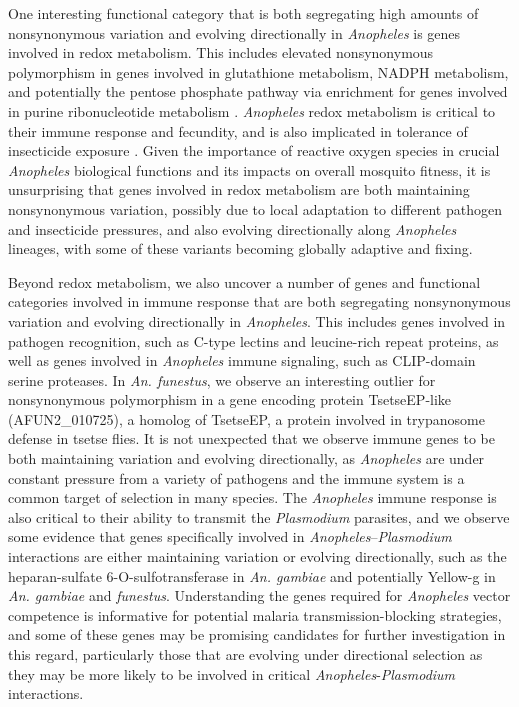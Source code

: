 One interesting functional category that is both 
segregating high amounts of nonsynonymous variation
and evolving directionally in \textit{Anopheles} is 
genes involved in redox metabolism. 
This includes elevated nonsynonymous polymorphism in 
genes involved in glutathione metabolism, NADPH metabolism, and 
potentially the pentose phosphate pathway via enrichment 
for genes involved in purine ribonucleotide metabolism 
\citep{Kanehisa_Furumichi_Sato_Matsuura_Ishiguro-Watanabe_2024}.
\textit{Anopheles} redox metabolism is critical to 
their immune response and fecundity, 
and is also implicated in tolerance of insecticide exposure 
\citep{redox_fecundity, redox_plasmodium, redox_gutmicro}.
Given the importance of reactive oxygen species in crucial
\textit{Anopheles} biological functions and its impacts on overall
mosquito fitness, it is unsurprising that genes involved in 
redox metabolism are both maintaining nonsynonymous variation, 
possibly due to local adaptation to different pathogen and 
insecticide pressures, and also evolving directionally along 
\textit{Anopheles} lineages, with some of these variants 
becoming globally adaptive and fixing.

Beyond redox metabolism, we also uncover a number of genes and 
functional categories involved in immune response that are 
both segregating nonsynonymous variation and evolving directionally in \textit{Anopheles}.
This includes genes involved in pathogen recognition, 
such as C-type lectins and leucine-rich repeat proteins, as 
well as genes involved in \textit{Anopheles} immune signaling, 
such as CLIP-domain serine proteases.
In \textit{An. funestus}, we observe an interesting outlier 
for nonsynonymous polymorphism in a gene encoding protein TsetseEP-like
(AFUN2\_010725), a homolog of TsetseEP,
a protein involved in trypanosome defense in tsetse flies.
It is not unexpected that we observe immune genes to be both
maintaining variation and evolving directionally,
as \textit{Anopheles} are under constant pressure from a variety of pathogens
and the immune system is a common target of selection in many species.
The \textit{Anopheles} immune response is also critical to their
ability to transmit the \textit{Plasmodium} parasites,
and we observe some evidence that genes specifically involved in
\textit{Anopheles}--\textit{Plasmodium} interactions
are either maintaining variation or evolving directionally, such 
as the heparan-sulfate 6-O-sulfotransferase in \textit{An. gambiae} and
potentially Yellow-g in \textit{An. gambiae} and \textit{funestus}.
Understanding the genes required for \textit{Anopheles} vector 
competence is informative for 
potential malaria transmission-blocking strategies,
and some of these genes may be promising candidates for further 
investigation in this regard, 
particularly those that are evolving under directional selection 
as they may be more likely to be involved in critical 
\textit{Anopheles}-\textit{Plasmodium} interactions.

